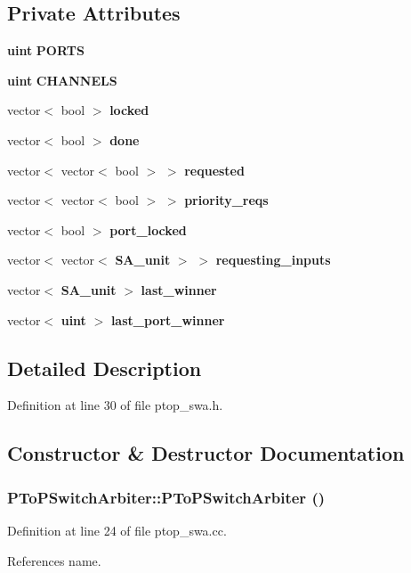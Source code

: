 \subsection*{Private Attributes}
\begin{CompactItemize}
\item 
{\bf uint} {\bf PORTS}
\item 
{\bf uint} {\bf CHANNELS}
\item 
vector$<$ bool $>$ {\bf locked}
\item 
vector$<$ bool $>$ {\bf done}
\item 
vector$<$ vector$<$ bool $>$ $>$ {\bf requested}
\item 
vector$<$ vector$<$ bool $>$ $>$ {\bf priority\_\-reqs}
\item 
vector$<$ bool $>$ {\bf port\_\-locked}
\item 
vector$<$ vector$<$ {\bf SA\_\-unit} $>$ $>$ {\bf requesting\_\-inputs}
\item 
vector$<$ {\bf SA\_\-unit} $>$ {\bf last\_\-winner}
\item 
vector$<$ {\bf uint} $>$ {\bf last\_\-port\_\-winner}
\end{CompactItemize}


\subsection{Detailed Description}


Definition at line 30 of file ptop\_\-swa.h.

\subsection{Constructor \& Destructor Documentation}
\subsubsection[{PToPSwitchArbiter}]{\setlength{\rightskip}{0pt plus 5cm}PToPSwitchArbiter::PToPSwitchArbiter ()}\label{classPToPSwitchArbiter_dc9c6f383f3f135ca2fa003380b52021}




Definition at line 24 of file ptop\_\-swa.cc.

References name.
